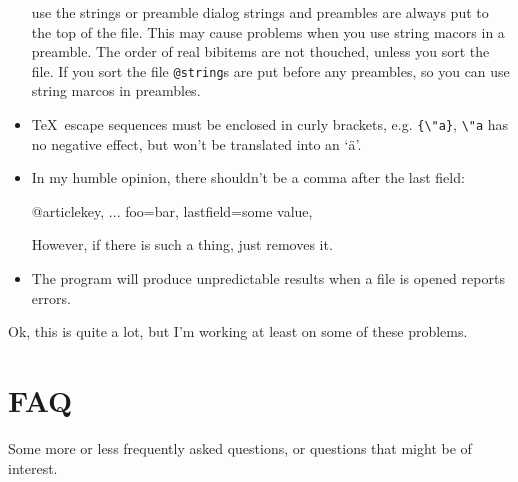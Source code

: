 \documentclass[oneside,10pt]{article}
\begin{document}
\begin{itemize}
    use the strings or preamble dialog strings and preambles
    are always put to the top of the file.
    This may cause problems when you use string macors in a preamble. The order
    of real bibitems are not thouched, unless you sort the file. If you sort the
    file \verb|@string|s are put before any preambles, so you can use string marcos in
    preambles.
  \item \TeX\ escape sequences must be enclosed in curly brackets, e.g. \verb|{\"a}|,
    \verb|\"a| has no negative effect, but won't be translated into an `\"a'.
  \item In my humble opinion, there shouldn't be a comma after the last field:
\begin{code}
@article{key,
  ...
  foo={bar},
  lastfield={some value},
}
\end{code}
    However, if there is such a thing, \BibEdt{} just removes it.
  \item The program will produce unpredictable results when a file is opened \BibTeX{}
    reports errors.
\end{itemize}
Ok, this is quite a lot, but I'm working at least on some of these problems.

\section{FAQ}
\label{sec:Faq}

Some more or less frequently asked questions, or questions that might be of interest.
\end{document}
